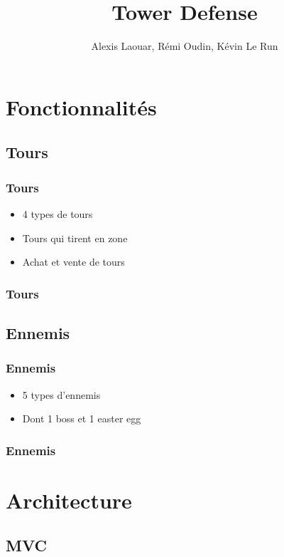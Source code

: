 \documentclass[pdf]{beamer}
\title{Tower Defense}
\author{Alexis Laouar, R\'emi Oudin, K\'evin Le Run}
\begin{document}
\begin{frame}
  \titlepage
\end{frame}

\section{Fonctionnalit\'es}

\subsection{Tours}
\begin{frame}
  \frametitle{Tours}
  \begin{itemize}
  \item 4 types de tours
  \item Tours qui tirent en zone
  \item Achat et vente de tours
  \end{itemize}
\end{frame}

\begin{frame}[fragile]
    \frametitle{Tours}
    
\end{frame}

\subsection{Ennemis}
\begin{frame}
  \frametitle{Ennemis}
  \begin{itemize}
  \item 5 types d'ennemis
  \item Dont 1 boss et 1 easter egg
  \end{itemize}
\end{frame}

\begin{frame}
    \frametitle{Ennemis}
    
\end{frame}

\section{Architecture}

\subsection{MVC}
\end{document}
